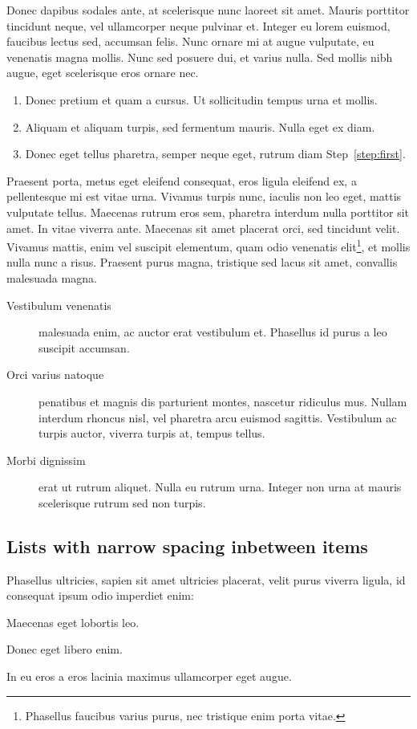 Donec dapibus sodales ante, at scelerisque nunc laoreet sit amet. Mauris porttitor tincidunt neque, vel ullamcorper neque pulvinar et. Integer eu lorem euismod, faucibus lectus sed, accumsan felis. Nunc ornare mi at augue vulputate, eu venenatis magna mollis. Nunc sed posuere dui, et varius nulla. Sed mollis nibh augue, eget scelerisque eros ornare nec.

\begin{enumerate}
	\item\label{step:first} Donec pretium et quam a cursus. Ut sollicitudin tempus urna et mollis.
	\item Aliquam et aliquam turpis, sed fermentum mauris. Nulla eget ex diam.
	\item Donec eget tellus pharetra, semper neque eget, rutrum diam Step~\ref{step:first}.
\end{enumerate}

Praesent porta, metus eget eleifend consequat, eros ligula eleifend ex, a pellentesque mi est vitae urna. Vivamus turpis nunc, iaculis non leo eget, mattis vulputate tellus. Maecenas rutrum eros sem, pharetra interdum nulla porttitor sit amet. In vitae viverra ante. Maecenas sit amet placerat orci, sed tincidunt velit. Vivamus mattis, enim vel suscipit elementum, quam odio venenatis elit\footnote{Phasellus faucibus varius purus, nec tristique enim porta vitae.}, et mollis nulla nunc a risus. Praesent purus magna, tristique sed lacus sit amet, convallis malesuada magna. 

\begin{description}
	\item[Vestibulum venenatis] malesuada enim, ac auctor erat vestibulum et. Phasellus id purus a leo suscipit accumsan.
	\item[Orci varius natoque] penatibus et magnis dis parturient montes, nascetur ridiculus mus. Nullam interdum rhoncus nisl, vel pharetra arcu euismod sagittis. Vestibulum ac turpis auctor, viverra turpis at, tempus tellus.
	\item[Morbi dignissim] erat ut rutrum aliquet. Nulla eu rutrum urna. Integer non urna at mauris scelerisque rutrum sed non turpis.
\end{description}

\subsection{Lists with narrow spacing inbetween items}

Phasellus ultricies, sapien sit amet ultricies placerat, velit purus viverra ligula, id consequat ipsum odio imperdiet enim:
\begin{compactenum}
	\item Maecenas eget lobortis leo.
	\item Donec eget libero enim.
	\item In eu eros a eros lacinia maximus ullamcorper eget augue.
\end{compactenum}

